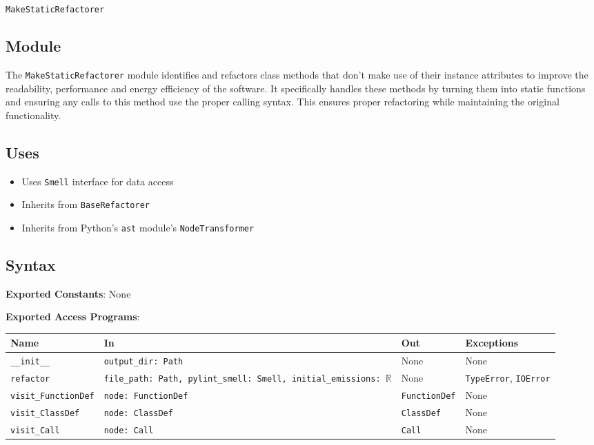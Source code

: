 \documentclass[12pt, titlepage]{article}
\begin{document}
\texttt{MakeStaticRefactorer}

\subsection{Module}

The \texttt{MakeStaticRefactorer} module identifies and refactors 
class methods that don't make use of their instance attributes to improve the readability, performance and energy efficiency of the software. It specifically handles these methods by turning them into static functions and ensuring any calls to this method use the proper calling syntax. This ensures proper refactoring while maintaining the original functionality.

\subsection{Uses}
\begin{itemize}
  \item Uses \texttt{Smell} interface for data access
  \item Inherits from \texttt{BaseRefactorer}
  \item Inherits from Python's \texttt{ast} module's \texttt{NodeTransformer}
\end{itemize}
  
\subsection{Syntax}
\noindent
\textbf{Exported Constants}: None

\noindent
\textbf{Exported Access Programs}:
  
\begin{tabularx}{\linewidth}{|l|>{\raggedright\arraybackslash}X|l|l|}
  \toprule Name & In & Out & Exceptions \\
  \midrule
  \texttt{\_\_init\_\_} & \texttt{output\_dir: Path} & None & None \\
  \hline
  \texttt{refactor} & \texttt{file\_path: Path, pylint\_smell: Smell, initial\_emissions: $\mathbb{R}$} & None & \texttt{TypeError}, \texttt{IOError} \\
  \hline
  \texttt{visit\_FunctionDef} & \texttt{node: FunctionDef} & \texttt{FunctionDef} & None \\
  \hline
  \texttt{visit\_ClassDef} & \texttt{node: ClassDef} & \texttt{ClassDef} & None \\
  \hline
  \texttt{visit\_Call} & \texttt{node: Call} & \texttt{Call} & None \\
  \bottomrule
\end{tabularx}
  
\end{document}
